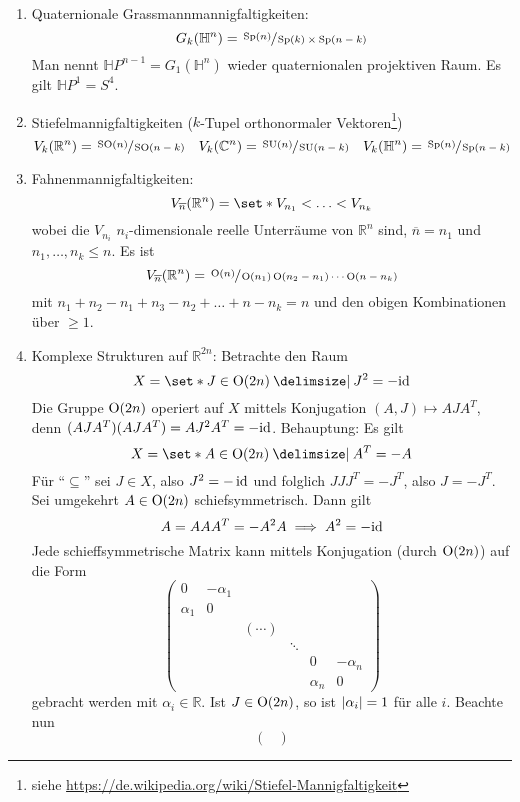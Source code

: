 \begin{beispiel*}[{name=[homogene Räume]},label=bsp:homSpaces]
\begin{enumerate}[1)]
		Es gilt $\mathbb{C}P^1 = S^2$.
		\item Quaternionale Grassmannmannigfaltigkeiten:
		\[
			G_k(\mathbb{H}^n) = \sfrac{\Sp(n)}{\Sp(k) \times \Sp(n-k)}
		\]
		Man nennt $\mathbb{H}P^{n-1} = G_1(\mathbb{H}^n)$ wieder quaternionalen projektiven Raum. 
		Es gilt $\mathbb{H}P^1 = S^4$.
		\item Stiefelmannigfaltigkeiten ($k$-Tupel orthonormaler Vektoren\footnote{siehe \url{https://de.wikipedia.org/wiki/Stiefel-Mannigfaltigkeit}})
		\[
			V_k(\mathbb{R}^n) = \sfrac{\SO(n)}{\SO(n-k)} \quad V_k(\mathbb{C}^n) = \sfrac{\SU(n)}{\SU(n-k)} \quad V_k(\mathbb{H}^n) = \sfrac{\Sp(n)}{\Sp(n-k)}
		\]
		\item Fahnenmannigfaltigkeiten:
		\[
			V_{\overline{n}}(\mathbb{R}^n) = \set*{V_{n_1} < \ldots < V_{n_k}}
		\]
		wobei die $V_{n_i}$ $n_i$-dimensionale reelle Unterräume von $\mathbb{R}^n$ sind, $\overline{n} = n_1$ und $ n_1, \ldots ,n_k \le n$.
		Es ist
		\[
			V_{\overline{n}}(\mathbb{R}^n) = \sfrac{\On(n)}{\On(n_1) \On(n_2 - n_1) \cdots \On(n-n_k)}
		\]
		mit $n_1 + n_2 - n_1 + n_3 - n_2 + \ldots + n - n_k =n$ und den obigen Kombinationen über $\ge 1$.
		\item Komplexe Strukturen auf $\mathbb{R}^{2n}$:
		Betrachte den Raum
		\[
			X = \set*{J \in  \On(2n) \given J^2 = - {\id}}
		\]
		Die Gruppe $\On(2n)$ operiert auf $X$ mittels Konjugation $(A,J) \mapsto A J A^T$, denn $(AJA^T)(AJA^T) = A J^2 A^T = - {\id}$.
		Behauptung: Es gilt 
		\[
			X = \set*{A \in \On(2n) \given A^T = -A}
		\]
		Für \enquote{$\subseteq$} sei $J \in X$, also $J^2 = - \id$ und folglich $J J J^T = - J^T$, also $J= -J^T$.
		Sei umgekehrt $A \in \On(2n)$ schiefsymmetrisch.
		Dann gilt
		\[
			A = A A A^T = - A^2 A\implies A^2 = - {\id}
		\]
		Jede schieffsymmetrische Matrix kann mittels Konjugation (durch $\On(2n)$) auf die Form 
		\[
			\begin{pmatrix}
				0 & - \alpha_1 & & & & \\
				\alpha_1 & 0 & & & & \\
				& & (\cdots) & & &  \\
				& & & \ddots & & \\
				& & & & 0 & -\alpha_n \\
				& & & & \alpha_n & 0
			\end{pmatrix}
		\]
		gebracht werden mit $\alpha_i \in \mathbb{R}$.
		Ist $J \in \On(2n)$, so ist $\abs*{\alpha_i}=1 $ für alle $i$.
		Beachte nun
		\[
			\begin{pmatrix}

\end{pmatrix}\]
\end{enumerate}
\end{beispiel*}
